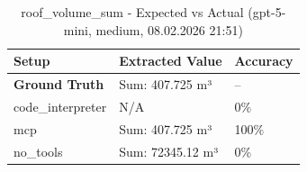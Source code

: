 \documentclass[a4paper,11pt]{article}
\begin{document}
\begin{table}[H]
\centering
\scriptsize
\caption{roof\_volume\_sum - Expected vs Actual (gpt-5-mini, medium, 08.02.2026 21:51)}
\begin{tabular}{l l l}
\toprule
Setup & Extracted Value & Accuracy \\
\midrule
\textbf{Ground Truth} & Sum: 407.725 m³ & -- \\
\midrule
code\_interpreter & N/A & 0\% \\
mcp & Sum: 407.725 m³ & 100\% \\
no\_tools & Sum: 72345.12 m³ & 0\% \\
\bottomrule
\end{tabular}
\end{table}

\clearpage
\end{document}
